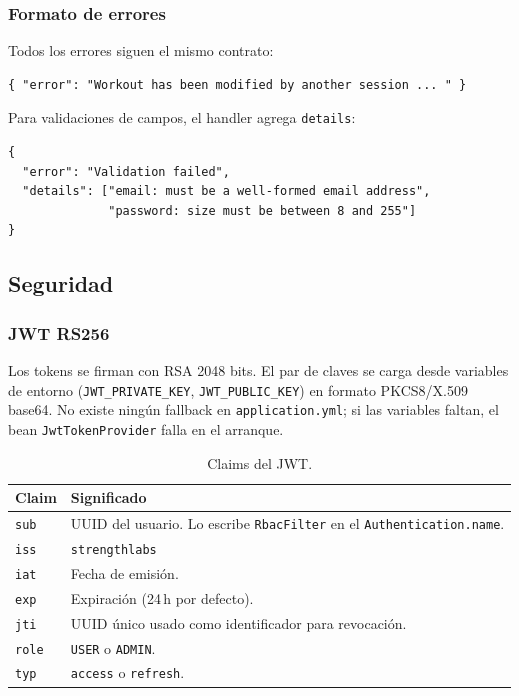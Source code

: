 \documentclass[11pt,a4paper]{article}
\newcommand{\cls}[1]{\texttt{\small #1}}
\begin{document}
\subsubsection{Formato de errores}

Todos los errores siguen el mismo contrato:

\begin{lstlisting}
{ "error": "Workout has been modified by another session ... " }
\end{lstlisting}

Para validaciones de campos, el handler agrega \texttt{details}:

\begin{lstlisting}
{
  "error": "Validation failed",
  "details": ["email: must be a well-formed email address",
              "password: size must be between 8 and 255"]
}
\end{lstlisting}

\subsection{Seguridad}

\subsubsection{JWT RS256}

Los tokens se firman con RSA 2048 bits. El par de claves se carga desde variables de entorno (\texttt{JWT\_PRIVATE\_KEY}, \texttt{JWT\_PUBLIC\_KEY}) en formato PKCS8/X.509 base64. No existe ningún fallback en \texttt{application.yml}; si las variables faltan, el bean \cls{JwtTokenProvider} falla en el arranque.

\begin{table}[H]
\centering
\begin{tabular}{lp{}}
\toprule
\textbf{Claim} & \textbf{Significado} \\
\midrule
\texttt{sub}  & UUID del usuario. Lo escribe \cls{RbacFilter} en el \texttt{Authentication.name}. \\
\texttt{iss}  & \texttt{strengthlabs} \\
\texttt{iat}  & Fecha de emisión. \\
\texttt{exp}  & Expiración (24\,h por defecto). \\
\texttt{jti}  & UUID único usado como identificador para revocación. \\
\texttt{role} & \texttt{USER} o \texttt{ADMIN}. \\
\texttt{typ}  & \texttt{access} o \texttt{refresh}. \\
\bottomrule
\end{tabular}
\caption{Claims del JWT.}
\end{table}
\end{document}
